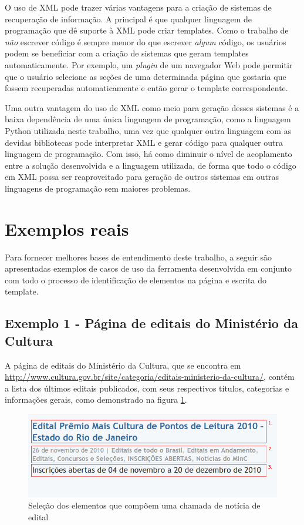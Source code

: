 O uso de XML pode trazer várias vantagens para a criação de sistemas de recuperação de informação. A principal é que qualquer linguagem de programação que dê suporte à XML pode criar templates. Como o trabalho de \emph{não} escrever código é sempre menor do que escrever \emph{algum} código, os usuários podem se beneficiar com a criação de sistemas que geram templates automaticamente. Por exemplo, um \emph{plugin} de um navegador Web pode permitir que o usuário selecione as seções de uma determinada página que gostaria que fossem recuperadas automaticamente e então gerar o template correspondente. 

Uma outra vantagem do uso de XML como meio para geração desses sistemas é a baixa dependência de uma única linguagem de programação, como a linguagem Python utilizada neste trabalho, uma vez que qualquer outra linguagem com as devidas bibliotecas pode interpretar XML e gerar código para qualquer outra linguagem de programação. Com isso, há como diminuir o nível de acoplamento entre a solução desenvolvida e a linguagem utilizada, de forma que todo o código em XML possa ser reaproveitado para geração de outros sistemas em outras linguagens de programação sem maiores problemas.

\pagebreak
\section{Exemplos reais}

Para fornecer melhores bases de entendimento deste trabalho, a seguir são apresentadas exemplos de casos de uso da ferramenta desenvolvida em conjunto com todo o processo de identificação de elementos na página e escrita do template.

\subsection{Exemplo 1 - Página de editais do Ministério da Cultura}

A página de editais do Ministério da Cultura, que se encontra em \url{http://www.cultura.gov.br/site/categoria/editais-ministerio-da-cultura/}, contém a lista dos últimos editais publicados, com seus respectivos títulos, categorias e informações gerais, como demonstrado na figura \ref{minc}.

\begin{figure} [ht]
	\centering
	\includegraphics[scale=0.8]{minc.png}
	\caption{Seleção dos elementos que compõem uma chamada de notícia de edital}
	\label{minc}
\end{figure}

